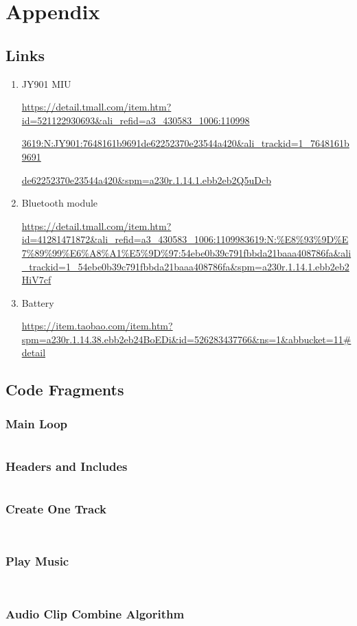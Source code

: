 \section{Appendix}

\subsection{Links}

\begin{enumerate}
\item JY901 MIU

\url{https://detail.tmall.com/item.htm?id=521122930693&ali_refid=a3_430583_1006:110998}

\url{3619:N:JY901:7648161b9691de62252370e23544a420&ali_trackid=1_7648161b9691}

\url{ de62252370e23544a420&spm=a230r.1.14.1.ebb2eb2Q5uDcb} 

\item  Bluetooth module 

\url{https://detail.tmall.com/item.htm?id=41281471872&ali_refid=a3_430583_1006:1109983619:N:%E8%93%9D%E7%89%99%E6%A8%A1%E5%9D%97:54ebe0b39c791fbbda21baaa408786fa&ali_trackid=1_54ebe0b39c791fbbda21baaa408786fa&spm=a230r.1.14.1.ebb2eb2HiV7cf}
\item  Battery 

\url{https://item.taobao.com/item.htm?spm=a230r.1.14.38.ebb2eb24BoEDi&id=526283437766&ns=1&abbucket=11#detail} 

\end{enumerate}


\subsection{Code Fragments}

\subsubsection{Main Loop}
\inputminted[tabsize=4]{csharp}{scr/OnGui.cs}

\newpage


\subsubsection{Headers and Includes}
\inputminted[tabsize=4]{csharp}{scr/Headers.cs}

\newpage

\subsubsection{Create One Track}
\inputminted[tabsize=4]{csharp}{scr/CreateOneTrack.cs}
\newpage
\inputminted[tabsize=4]{csharp}{scr/cot2.cs}


\subsubsection{Play Music}
\inputminted[tabsize=4]{csharp}{scr/PlayMusic.cs}
\newpage
\inputminted[tabsize=4]{csharp}{scr/pm2.cs}


\subsubsection{Audio Clip Combine Algorithm}
\inputminted[tabsize=4]{csharp}{scr/ACCombine.cs}
\newpage
\inputminted[tabsize=4]{csharp}{scr/acc2.cs}

